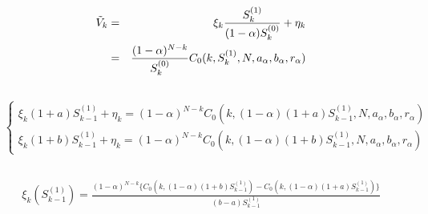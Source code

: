 \documentclass[12pt]{article}
\newenvironment{solution}[2][Solution]{\begin{trivlist}
\item[\hskip \labelsep {\bfseries #1}\hskip \labelsep {\bfseries #2.}]}{\end{trivlist}}
\newenvironment{question}[2][Question]{\begin{trivlist}
\item[\hskip \labelsep {\bfseries #1}\hskip \labelsep {\bfseries #2.}]}{\end{trivlist}}
\begin{document}
\begin{question}{9}
\end{question}
\begin{solution}[Solution]\\ 
\begin{eqnarray*}
\Tilde{V}_k &=& \xi_k \frac{S_k^{(1)}}{(1-\alpha)S_k^{(0)}} + \eta_k \\
&=& \frac{(1-\alpha)^{N-k}}{S_k^{(0)}} C_0(k,S_k^{(1)},N,a_{\alpha},b_{\alpha},r_{\alpha})
\end{eqnarray*}\\

\begin{eqnarray*}
\begin{cases}
\xi_k (1+a)S_{k-1}^{(1)} + \eta_k = (1-\alpha)^{N-k} C_0(k,(1-\alpha)(1+a)S_{k-1}^{(1)},N,a_{\alpha},b_{\alpha},r_{\alpha}) \\
\xi_k (1+b)S_{k-1}^{(1)} + \eta_k = (1-\alpha)^{N-k} C_0(k,(1-\alpha)(1+b)S_{k-1}^{(1)},N,a_{\alpha},b_{\alpha},r_{\alpha})
\end{cases}\\
\end{eqnarray*}\\

\begin{eqnarray*}
\xi_k \left( S_{k-1}^{(1)} \right) = \frac{(1-\alpha)^{N-k} \{C_0(k,(1-\alpha)(1+b)S_{k-1}^{(1)})- C_0(k,(1-\alpha)(1+a)S_{k-1}^{(1)})\}}{(b-a)S_{k-1}^{(1)}}
\end{eqnarray*}
\end{solution}
\end{document}

